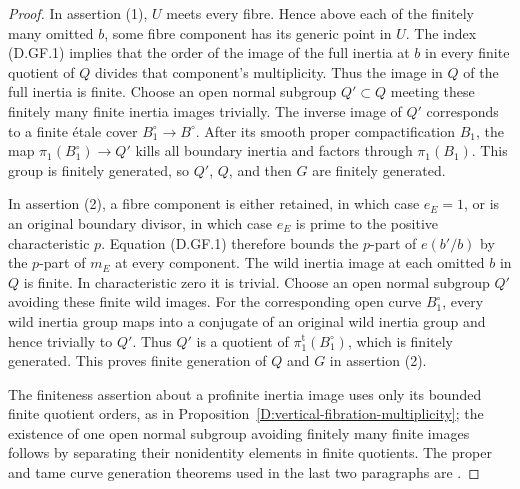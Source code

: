 \begin{proof}
In assertion (1), $U$ meets every fibre.  Hence above each
of the finitely many omitted $b$, some fibre component
has its generic point in $U$.  The index (D.GF.1) implies
that the order of the image of the full inertia at $b$
in every finite quotient of $Q$ divides that component's
multiplicity.  Thus the image in $Q$ of the full inertia
is finite.  Choose an open normal subgroup $Q'\subset Q$
meeting these finitely many finite inertia images trivially.
The inverse image of $Q'$ corresponds to a finite \'etale
cover $B_1^\circ\to B^\circ$.  After its smooth proper
compactification $B_1$, the map
$\pi_1(B_1^\circ)\to Q'$ kills all boundary inertia and
factors through $\pi_1(B_1)$.  This group is finitely
generated, so $Q'$, $Q$, and then $G$ are finitely generated.

In assertion (2), a fibre component is either retained,
in which case $e_E=1$, or is an original boundary divisor,
in which case $e_E$ is prime to the positive characteristic
$p$.  Equation (D.GF.1) therefore bounds the $p$-part of
$e(b'/b)$ by the $p$-part of $m_E$ at every component.
The wild inertia image at each omitted $b$ in $Q$ is
finite.  In characteristic zero it is trivial.  Choose
an open normal subgroup $Q'$ avoiding these finite wild
images.  For the corresponding open curve $B_1^\circ$,
every wild inertia group maps into a conjugate of an
original wild inertia group and hence trivially to $Q'$.
Thus $Q'$ is a quotient of $\pi_1^{\mathrm t}(B_1^\circ)$,
which is finitely generated.  This proves finite generation
of $Q$ and $G$ in assertion (2).

The finiteness assertion about a profinite inertia image
uses only its bounded finite quotient orders, as in
Proposition~\ref{D:vertical-fibration-multiplicity}; the
existence of one open normal subgroup avoiding finitely
many finite images follows by separating their nonidentity
elements in finite quotients.  The proper and tame curve
generation theorems used in the last two paragraphs are
\cite[X, Theorem 2.6; XIII, Corollary 2.12]{SGA1}.
\end{proof}

